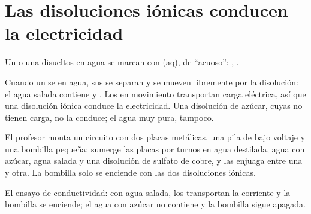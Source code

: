\section{Las disoluciones iónicas conducen la electricidad}

\begin{notation}\label{not:g9:ions:aq}
Un  o una  disueltos en agua se marcan con (aq), de
``acuoso'':
, .
\end{notation}

\begin{proposition}\label{prop:g9:ions:conduct}
Cuando un  se  en agua, sus  se separan y
se mueven libremente por la disolución: el agua salada contiene
 y . Los  en movimiento transportan carga
eléctrica, así que una disolución iónica conduce la electricidad. Una
disolución de azúcar, cuyas  no tienen carga, no la conduce; el
agua muy pura, tampoco.
\end{proposition}

\begin{inthelab}
El profesor monta un circuito con dos placas metálicas, una pila de
bajo voltaje y una bombilla pequeña; sumerge las placas por turnos en
agua destilada, agua con azúcar, agua salada y una disolución de sulfato
de cobre, y las enjuaga entre una y otra. La bombilla solo se enciende
con las dos disoluciones iónicas.
\end{inthelab}

\begin{omfigure}

{\small El ensayo de conductividad: con agua salada, los 
transportan la corriente y la bombilla se enciende; el agua con azúcar
no contiene  y la bombilla sigue apagada.}
\end{omfigure}

